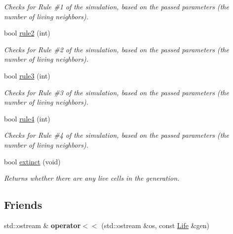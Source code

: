 \begin{DoxyCompactItemize}
\begin{DoxyCompactList}\small\item\em Checks for Rule \#1 of the simulation, based on the passed parameters (the number of living neighbors). \end{DoxyCompactList}\item 
\mbox{\label{classLife_a39af42ed3d213e996cf979eb902648fb}} 
bool \hyperlink{classLife_a39af42ed3d213e996cf979eb902648fb}{rule2} (int)
\begin{DoxyCompactList}\small\item\em Checks for Rule \#2 of the simulation, based on the passed parameters (the number of living neighbors). \end{DoxyCompactList}\item 
\mbox{\label{classLife_a54f24025406f63cd2e0769d103aee1f5}} 
bool \hyperlink{classLife_a54f24025406f63cd2e0769d103aee1f5}{rule3} (int)
\begin{DoxyCompactList}\small\item\em Checks for Rule \#3 of the simulation, based on the passed parameters (the number of living neighbors). \end{DoxyCompactList}\item 
\mbox{\label{classLife_a09d1f42ec4c24dfe0ac4b9b7e39c3661}} 
bool \hyperlink{classLife_a09d1f42ec4c24dfe0ac4b9b7e39c3661}{rule4} (int)
\begin{DoxyCompactList}\small\item\em Checks for Rule \#4 of the simulation, based on the passed parameters (the number of living neighbors). \end{DoxyCompactList}\item 
\mbox{\label{classLife_a237dd91f30013fb44acc367153dca88b}} 
bool \hyperlink{classLife_a237dd91f30013fb44acc367153dca88b}{extinct} (void)
\begin{DoxyCompactList}\small\item\em Returns whether there are any live cells in the generation. \end{DoxyCompactList}\end{DoxyCompactItemize}
\subsection*{Friends}
\begin{DoxyCompactItemize}
\item 
\mbox{\label{classLife_a73fae2e719446b63959e359b90c2cc94}} 
std\+::ostream \& {\bfseries operator$<$$<$} (std\+::ostream \&os, const \hyperlink{classLife}{Life} \&gen)
\end{DoxyCompactItemize}


